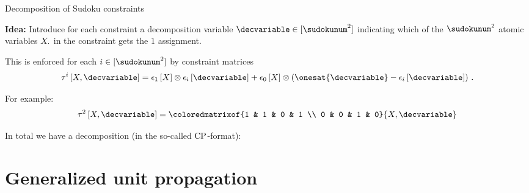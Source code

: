 \documentclass{beamer}
\begin{document}
    \begin{frame}{Decomposition of Sudoku constraints}

        {\bf Idea:} Introduce for each constraint a decomposition variable $\decvariable\in[\sudokunum^2]$ indicating which of the $\sudokunum^2$ atomic variables $X_{\cdot}$ in the constraint gets the $1$ assignment.

        This is enforced for each $i\in[\sudokunum^2]$ by constraint matrices
        \begin{align*}
            \hypercoreofat{i}{\catvariable,\decvariable}
            = \tbasisat{\catvariable} \otimes \onehotmapofat{i}{\decvariable}
            + \fbasisat{\catvariable} \otimes \left(\onesat{\decvariable} - \onehotmapofat{i}{\decvariable}\right) \, .
        \end{align*}

        For example:
        \begin{align*}
            \hypercoreofat{2}{\catvariable,\decvariable}
            = \coloredmatrixof{1 & 1 & 0 & 1 \\ 0 & 0 & 1 & 0}{\catvariable,\decvariable}
        \end{align*}

        In total we have a decomposition (in the so-called $\mathrm{CP}$-format):
        
    \end{frame}

%
%



    \section{Generalized unit propagation}
\end{document}
